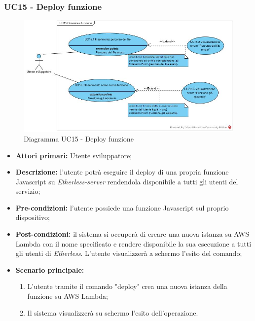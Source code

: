 \subsubsection{UC15 - Deploy funzione}
\begin{figure}[h]
	\centering
	\includegraphics[width=\linewidth]{res/img/UC15.jpg}
	\caption{Diagramma UC15 - Deploy funzione}
\end{figure}
\begin{itemize}
	\item \textbf{Attori primari:} Utente sviluppatore;
	\item \textbf{Descrizione:} l'utente potrà eseguire il deploy di una propria funzione Javascript su \textit{Etherless-server} rendendola disponibile a tutti gli utenti del servizio; 
	\item \textbf{Pre-condizioni:} l'utente possiede una funzione Javascript sul proprio dispositivo;
	\item \textbf{Post-condizioni:} il sistema si occuperà di creare una nuova istanza su AWS Lambda con il nome specificato e rendere disponibile la sua esecuzione a tutti gli utenti di \textit{Etherless}. L'utente visualizzerà a schermo l'esito del comando;
	\item \textbf{Scenario principale:} 
	\begin{enumerate}
		\item L'utente tramite il comando "deploy" crea una nuova istanza della funzione su AWS Lambda;
		\item Il sistema visualizzerà su schermo l'esito dell'operazione.
	\end{enumerate}
\end{itemize}